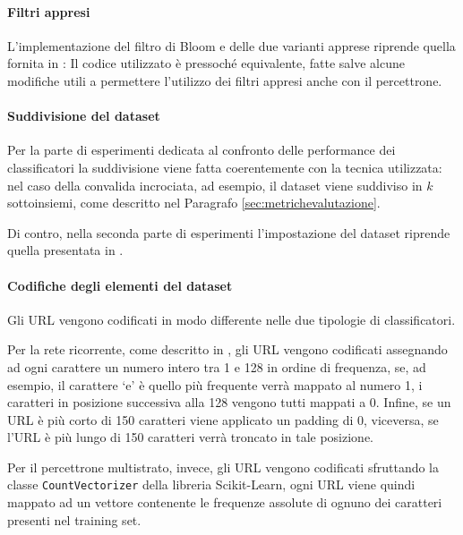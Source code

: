 \documentclass[../../main.tex]{subfiles}
\begin{document}
    \paragraph{Filtri appresi}
    L'implementazione del filtro di Bloom e delle due varianti apprese riprende quella fornita in \cite{ma2020}: Il codice utilizzato è pressoché equivalente, fatte salve alcune modifiche utili a permettere l'utilizzo dei filtri appresi anche con il percettrone.

    \paragraph{Suddivisione del dataset}
    Per la parte di esperimenti dedicata al confronto delle performance dei classificatori la suddivisione viene fatta coerentemente con la tecnica utilizzata: nel caso della convalida incrociata, ad esempio, il dataset viene suddiviso in $k$ sottoinsiemi, come descritto nel Paragrafo \ref{sec:metrichevalutazione}.

    Di contro, nella seconda parte di esperimenti l'impostazione del dataset riprende quella presentata in \cite{ma2020}.

    \paragraph{Codifiche degli elementi del dataset}
    Gli URL vengono codificati in modo differente nelle due tipologie di classificatori.

    Per la rete ricorrente, come descritto in \cite{ma2020}, gli URL vengono codificati assegnando ad ogni carattere un numero intero tra 1 e 128 in ordine di frequenza, se, ad esempio, il carattere `e' è quello più frequente verrà mappato al numero 1, i caratteri in posizione successiva alla 128 vengono tutti mappati a 0. Infine, se un URL è più corto di 150 caratteri viene applicato un padding di 0, viceversa, se l'URL è più lungo di 150 caratteri verrà troncato in tale posizione.

    Per il percettrone multistrato, invece, gli URL vengono codificati sfruttando la classe \texttt{CountVectorizer} della libreria Scikit-Learn, ogni URL viene quindi mappato ad un vettore contenente le frequenze assolute di ognuno dei caratteri presenti nel training set.
\end{document}
